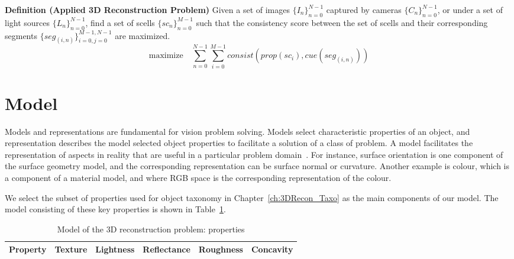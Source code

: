 
\noindent\textbf{Definition (Applied 3D Reconstruction Problem)} Given a set of images $\{I_n\}_{n=0}^{N-1}$ captured by cameras $\{C_n\}_{n=0}^{N-1}$, or under a set of light sources $\{L_n\}_{n=0}^{N-1}$, find a set of scells $\{sc_n\}_{n=0}^{M-1}$ such that the consistency score between the set of scells and their corresponding segments $\{seg_{(i, n)}\}_{i=0,j=0}^{M-1,N-1}$ are maximized.
$$
\mbox{maximize} \quad \sum_{n=0}^{N-1}\sum_{i=0}^{M-1} consist(prop(sc_i), cue(seg_{(i, n)}))
$$

\section{Model}
\label{sec:3DRecon_Model}
Models and representations are fundamental for vision problem solving. Models select characteristic properties of an object, and representation describes the model selected object properties to facilitate a solution of a class of problem. A model facilitates the representation of aspects in reality that are useful in a particular problem domain~\cite{bolles19863dpo}. For instance, surface orientation is one component of the surface geometry model, and the corresponding representation can be surface normal or curvature. Another example is colour, which is a component of a material model, and where RGB space is the corresponding representation of the colour.

We select the subset of properties used for object taxonomy in Chapter~\ref{ch:3DRecon_Taxo} as the main components of our model. The model consisting of these key properties is shown in Table~\ref{tab:3DRecon_model}.
\begin{table}[h]
  \centering
  \begin{tabular}{l|*{5}{c}}
  \hline
  \textbf{Property} & Texture & Lightness & Reflectance & Roughness & Concavity\\
  \hline
  \end{tabular}
  \caption{Model of the 3D reconstruction problem: properties}
  \label{tab:3DRecon_model}
\end{table}



